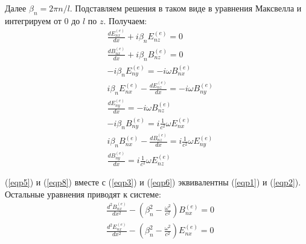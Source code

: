 \documentclass[a4paper,12pt]{extarticle} %
\newcommand{\Dff}[2]{\frac{d #1}{d #2}}
\newcommand{\Dfs}[2]{\frac{d^2 #1}{d #2^2}}
\begin{document}
Далее $\beta_n = 2 \pi n/l$. Подставляем решения в таком виде в уравнения Максвелла и интегрируем от 0 до $l$ по $z$. Получаем:
\begin{align}
& \Dff{E^{(e)}_{nx}}{x} + i \beta_n E^{(e)}_{nz} = 0 									\label{eqp1}\\
& \Dff{B^{(e)}_{nx}}{x} + i \beta_n B^{(e)}_{nz} = 0 									\label{eqp2}\\ 
& - i \beta_n E^{(e)}_{ny} = - i \omega B^{(e)}_{nx} 									\label{eqp3}\\
& i \beta_n E^{(e)}_{nx} - \Dff{E^{(e)}_{nz}}{x} = - i \omega B^{(e)}_{ny} 				\label{eqp4}\\
& \Dff{E^{(e)}_{ny}}{x} = - i \omega B^{(e)}_{nz} 										\label{eqp5}\\
& - i \beta_n B^{(e)}_{ny} = i \frac{1}{c^2} \omega E^{(e)}_{nx} 						\label{eqp6}\\
& i \beta_n B^{(e)}_{nx} - \Dff{B^{(e)}_{nz}}{x} = i \frac{1}{c^2} \omega E^{(e)}_{ny} 	\label{eqp7}\\
& \Dff{B^{(e)}_{ny}}{x} = i \frac{1}{c^2} \omega E^{(e)}_{nz}							\label{eqp8}
\end{align}

(\ref{eqp5}) и (\ref{eqp8}) вместе с (\ref{eqp3}) и (\ref{eqp6}) эквивалентны (\ref{eqp1}) и (\ref{eqp2}). Остальные уравнения приводят к системе:
\begin{align*}
& \Dfs{B^{(e)}_{nx}}{x} - \left(\beta_n^2 - \frac{\omega^2}{c^2}\right) B^{(e)}_{nx}  =  0 \\
& \Dfs{E^{(e)}_{nx}}{x} - \left(\beta_n^2 - \frac{\omega^2}{c^2}\right) E^{(e)}_{nx}  =  0
\end{align*} 
\end{document}
